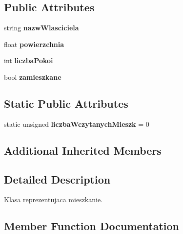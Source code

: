 \subsection*{Public Attributes}
\begin{DoxyCompactItemize}
\item 
string {\bfseries nazw\+Wlasciciela}\hypertarget{class_mieszkanie_ab23f8abec3a1366d04f8d5094d732c2f}{}\label{class_mieszkanie_ab23f8abec3a1366d04f8d5094d732c2f}

\item 
float {\bfseries powierzchnia}\hypertarget{class_mieszkanie_a422cafa9d46454798553657ef1701b55}{}\label{class_mieszkanie_a422cafa9d46454798553657ef1701b55}

\item 
int {\bfseries liczba\+Pokoi}\hypertarget{class_mieszkanie_aaf00f775428df4b565804d71f9c65da0}{}\label{class_mieszkanie_aaf00f775428df4b565804d71f9c65da0}

\item 
bool {\bfseries zamieszkane}\hypertarget{class_mieszkanie_aff64593cdcbf15d53f535d1a32f09332}{}\label{class_mieszkanie_aff64593cdcbf15d53f535d1a32f09332}

\end{DoxyCompactItemize}
\subsection*{Static Public Attributes}
\begin{DoxyCompactItemize}
\item 
static unsigned {\bfseries liczba\+Wczytanych\+Mieszk} = 0\hypertarget{class_mieszkanie_a3a33bdd1910bff7f953e56d6ec16de07}{}\label{class_mieszkanie_a3a33bdd1910bff7f953e56d6ec16de07}

\end{DoxyCompactItemize}
\subsection*{Additional Inherited Members}


\subsection{Detailed Description}
Klasa reprezentujaca mieszkanie. 

\subsection{Member Function Documentation}
